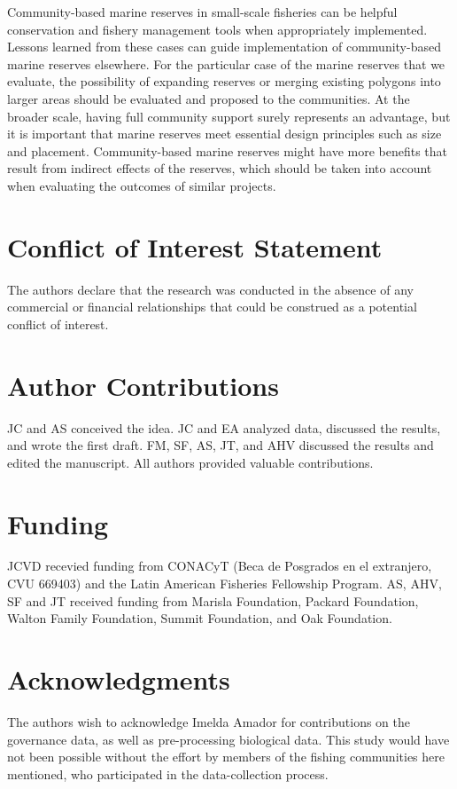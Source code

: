 \documentclass{frontiersSCNS}
\begin{document}
Community-based marine reserves in small-scale fisheries can be helpful
conservation and fishery management tools when appropriately
implemented. Lessons learned from these cases can guide implementation
of community-based marine reserves elsewhere. For the particular case of
the marine reserves that we evaluate, the possibility of expanding
reserves or merging existing polygons into larger areas should be
evaluated and proposed to the communities. At the broader scale, having
full community support surely represents an advantage, but it is
important that marine reserves meet essential design principles such as
size and placement. Community-based marine reserves might have more
benefits that result from indirect effects of the reserves, which should
be taken into account when evaluating the outcomes of similar projects.

\section*{Conflict of Interest Statement}

The authors declare that the research was conducted in the absence of
any commercial or financial relationships that could be construed as a
potential conflict of interest.

\section*{Author Contributions}

JC and AS conceived the idea. JC and EA analyzed data, discussed the
results, and wrote the first draft. FM, SF, AS, JT, and AHV discussed
the results and edited the manuscript. All authors provided valuable
contributions.

\section*{Funding}

JCVD recevied funding from CONACyT (Beca de Posgrados en el extranjero,
CVU 669403) and the Latin American Fisheries Fellowship Program. AS,
AHV, SF and JT received funding from Marisla Foundation, Packard
Foundation, Walton Family Foundation, Summit Foundation, and Oak
Foundation.

\section*{Acknowledgments}

The authors wish to acknowledge Imelda Amador for contributions on the
governance data, as well as pre-processing biological data. This study
would have not been possible without the effort by members of the
fishing communities here mentioned, who participated in the
data-collection process.
\end{document}
